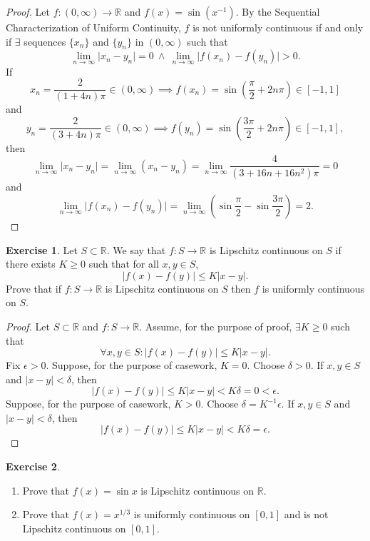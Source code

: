 \documentclass[12pt]{article}
\theoremstyle{definition}
\newtheorem{exercise}{Exercise}
\begin{document}
\begin{proof}
    Let \(f : (0, \infty) \to \mathbb{R}\) and \(f(x) = \sin(x^{-1})\). By the Sequential Characterization of Uniform Continuity, \(f\) is not uniformly continuous if and only if \(\exists\) sequences \(\{x_n\}\) and \(\{y_n\}\) in \((0, \infty)\) such that
    \[
        \lim_{n \to \infty}\vert x_n - y_n \vert = 0 \ \land \ \lim_{n \to \infty}\vert f(x_n) - f(y_n) \vert > 0.
    \]
    If
    \[
        x_n = \frac{2}{(1 + 4n)\pi} \in (0, \infty) \implies f(x_n) = \sin\left(\frac{\pi}{2} + 2n\pi\right) \in [-1, 1]
    \]
    and
    \[
        y_n = \frac{2}{(3 + 4n)\pi} \in (0, \infty) \implies f(y_n) = \sin\left(\frac{3\pi}{2} + 2n\pi\right) \in [-1, 1],
    \]
    then
    \[
        \lim_{n \to \infty}\vert x_n - y_n \vert = \lim_{n \to \infty}(x_n - y_n) = \lim_{n \to \infty}\frac{4}{(3 + 16n + 16n^2)\pi} = 0
    \]
    and
    \[
        \lim_{n \to \infty}\vert f(x_n) - f(y_n) \vert = \lim_{n \to \infty}\left( \sin\frac{\pi}{2} - \sin\frac{3\pi}{2} \right) = 2.
    \]
\end{proof}

\begin{exercise}
    Let \(S \subset \mathbb{R}\). We say that \(f : S \to \mathbb{R}\) is Lipschitz continuous on \(S\) if there exists \(K \geq 0\) such that for all \(x,y \in S\),
    \[
        \vert f(x) - f(y) \vert \leq K \vert x - y \vert.
    \]
    Prove that if \(f : S \to \mathbb{R}\) is Lipschitz continuous on \(S\) then \(f\) is uniformly continuous on \(S\).
\end{exercise}

\begin{proof}
    Let \(S \subset \mathbb{R}\) and \(f : S \to \mathbb{R}\). Assume, for the purpose of proof, \(\exists K \geq 0\) such that
    \[
        \forall x,y \in S : \vert f(x) - f(y) \vert \leq K \vert x - y \vert.
    \]
    Fix \(\epsilon > 0\). Suppose, for the purpose of casework, \(K = 0\). Choose \(\delta > 0\). If \(x,y \in S\) and \(\vert x - y \vert < \delta\), then
    \[
        \vert f(x) - f(y) \vert \leq K \vert x - y \vert < K\delta = 0 < \epsilon.
    \]
    Suppose, for the purpose of casework, \(K > 0\). Choose \(\delta = K^{-1}\epsilon\). If \(x,y \in S\) and \(\vert x - y \vert < \delta\), then
    \[
        \vert f(x) - f(y) \vert \leq K \vert x - y \vert < K\delta = \epsilon.
    \]
\end{proof}

\begin{exercise}
    \hfill
    \begin{enumerate}[label=(\alph*)]
        \item Prove that \(f(x) = \sin x\) is Lipschitz continuous on \(\mathbb{R}\).
        \item Prove that \(f(x) = x^{1/3}\) is uniformly continuous on \([0, 1]\) and is not Lipschitz continuous on \([0,1]\).
    \end{enumerate}
\end{exercise}
\end{document}
